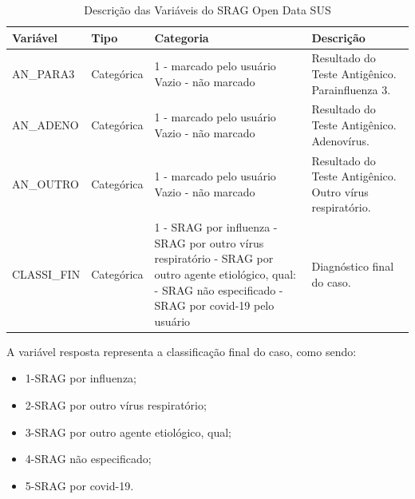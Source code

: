 \documentclass[12pt,oneside,a4paper,chapter=TITLE,
			   english,brazil]{abntex2}
\begin{document}
\begin{table}[H]
\caption[Descrição das Variáveis do SRAG Open Data SUS]{Descrição das Variáveis do SRAG Open Data SUS}
\centering
\begin{tabular}{p{4cm}p{2cm}p{3cm}p{7cm}}
\hline
\textbf{Variável} & \textbf{Tipo} & \textbf{Categoria} & \textbf{Descrição} \\
\hline
AN\_PARA3  & Categórica & 1 - marcado pelo usuário \newline Vazio - não marcado & Resultado do Teste Antigênico. Parainfluenza 3. \\
\hline
AN\_ADENO  & Categórica & 1 - marcado pelo usuário \newline Vazio - não marcado & Resultado do Teste Antigênico. Adenovírus. \\
\hline
AN\_OUTRO   & Categórica & 1 - marcado pelo usuário \newline Vazio - não marcado & Resultado do Teste Antigênico. Outro vírus respiratório. \\
\hline
CLASSI\_FIN  & Categórica & 1 - SRAG por influenza \newline
2 - SRAG por outro vírus 
respiratório \newline
3 - SRAG por outro agente     
etiológico, qual: \newline
4 - SRAG não especificado \newline 
5 - SRAG por covid-19 pelo usuário & Diagnóstico final do
caso. \\
\hline
\end{tabular}
\label{tab:variaveis}
\end{table}
\begin{flushleft}
\vspace{-1em}
\centering
{}
\end{flushleft}









A variável resposta representa  a classificação final  do caso,  como sendo: 

\begin{itemize}
\item 1-SRAG por influenza;  
\item 2-SRAG por outro vírus
respiratório;
\item 3-SRAG por outro agente etiológico, qual;
\item 4-SRAG não especificado;
\item 5-SRAG por covid-19.
\end{itemize}
\end{document}
